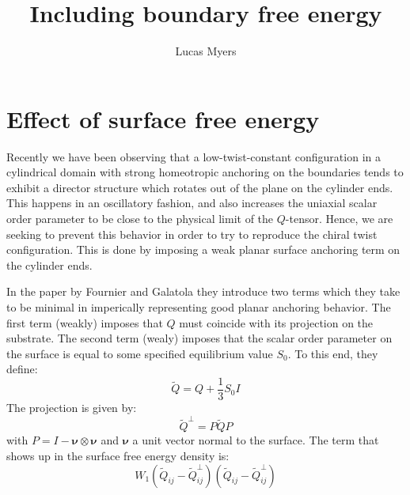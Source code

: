 \documentclass[reqno]{article}
\begin{document}
\title{Including boundary free energy}
\author{Lucas Myers}
\maketitle

\section{Effect of surface free energy}

Recently we have been observing that a low-twist-constant configuration in a cylindrical domain with strong homeotropic anchoring on the boundaries tends to exhibit a director structure which rotates out of the plane on the cylinder ends.
This happens in an oscillatory fashion, and also increases the uniaxial scalar order parameter to be close to the physical limit of the $Q$-tensor.
Hence, we are seeking to prevent this behavior in order to try to reproduce the chiral twist configuration.
This is done by imposing a weak planar surface anchoring term on the cylinder ends.

In the paper by Fournier and Galatola they introduce two terms which they take to be minimal in imperically representing good planar anchoring behavior.
The first term (weakly) imposes that $Q$ must coincide with its projection on the substrate.
The second term (wealy) imposes that the scalar order parameter on the surface is equal to some specified equilibrium value $S_0$.
To this end, they define:
\begin{equation}
    \tilde{Q}
    =
    Q
    + \frac13 S_0 I
\end{equation}
The projection is given by:
\begin{equation} \label{eq:Q-projection}
    \tilde{Q}^\perp
    =
    P \tilde{Q} P
\end{equation}
with $P = I - \boldsymbol{\nu} \otimes \boldsymbol{\nu}$ and $\boldsymbol{\nu}$ a unit vector normal to the surface.
The term that shows up in the surface free energy density is:
\begin{equation}
    W_1 \left(\tilde{Q}_{ij} - \tilde{Q}^\perp_{ij} \right)\left(\tilde{Q}_{ij} - \tilde{Q}^\perp_{ij} \right)
\end{equation}
\end{document}
